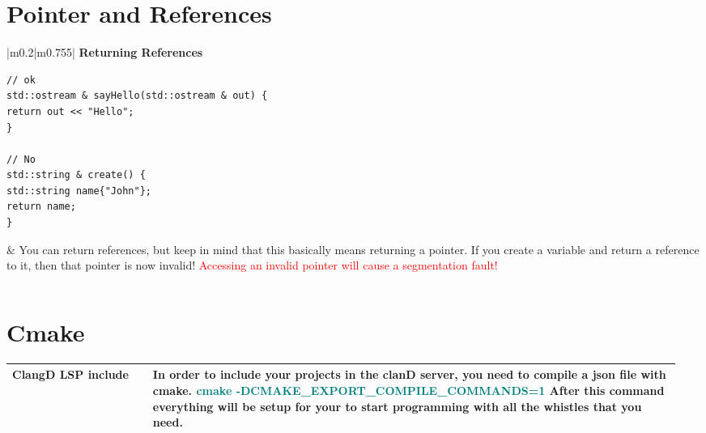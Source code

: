 \documentclass[main.tex,fontsize=8pt,paper=a4,paper=portrait,DIV=calc]{scrartcl}
\begin{document}
\begin{table}[ht!]
\section{Pointer and References}
\begin{tabular}{|m{0.2\linewidth}|m{0.755\linewidth}|}
\hline
\textbf{Returning References}\newline
\begin{lstlisting}
// ok
std::ostream & sayHello(std::ostream & out) {
return out << "Hello";
}

// No 
std::string & create() {
std::string name{"John"};
return name;
}
\end{lstlisting}
& 
You can return references, but keep in mind that this basically means returning a pointer.\newline
If you create a variable and return a reference to it, then that pointer is now invalid!\newline
\textcolor{red}{Accessing an invalid pointer will cause a segmentation fault!}\\
\hline
\end{tabular}
\begin{tabular}{|m{0.2\linewidth}|m{0.755\linewidth}|}
\hline

\hline
\end{tabular}
\section{Cmake}
\begin{tabular}{|m{0.2\linewidth}|m{0.755\linewidth}|}
\hline
\textbf{ClangD LSP include} & 
In order to include your projects in the clanD server, you need to compile a json file with cmake.\newline
\large\textbf{\textcolor{teal}{cmake -DCMAKE\_EXPORT\_COMPILE\_COMMANDS=1}}\newline
\normalsize After this command everything will be setup for your to start programming with all the whistles that you need.\\
\hline
\end{tabular}

\end{table}
\end{document}
